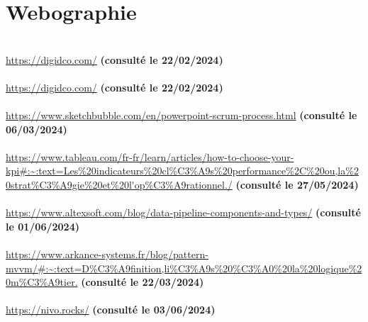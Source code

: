\chapter*{Webographie}


\\
{\url{https://digidco.com/}}
{\textbf{(consulté le 22/02/2024)}}\\


\\
{\url{https://digidco.com/}}
{\textbf{(consulté le 22/02/2024)}}\\


\\
{\url{https://www.sketchbubble.com/en/powerpoint-scrum-process.html}}
{\textbf{(consulté le 06/03/2024)}}\\


\\
{\url{https://www.tableau.com/fr-fr/learn/articles/how-to-choose-your-kpi#:~:text=Les%20indicateurs%20cl%C3%A9s%20performance%2C%20ou,la%20strat%C3%A9gie%20et%20l'op%C3%A9rationnel./}}
{\textbf{(consulté le 27/05/2024)}}\\


\\
{\url{https://www.altexsoft.com/blog/data-pipeline-components-and-types/}}
{\textbf{(consulté le 01/06/2024)}}\\


\\
{\url{https://www.arkance-systems.fr/blog/pattern-mvvm/#:~:text=D%C3%A9finition,li%C3%A9s%20%C3%A0%20la%20logique%20m%C3%A9tier.}}
{\textbf{(consulté le 22/03/2024)}}\\

\\
{\url{https://nivo.rocks/}}
{\textbf{(consulté le 03/06/2024)}}\\



